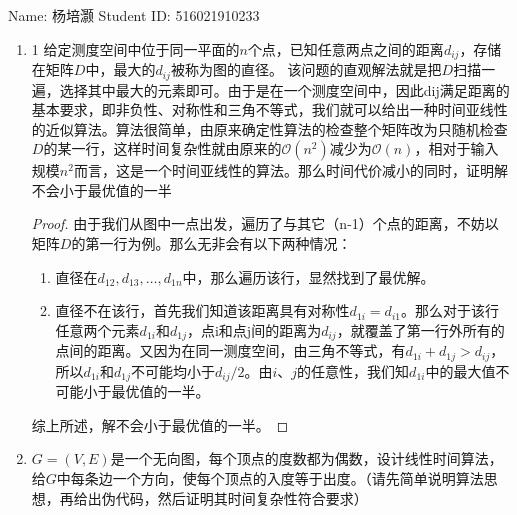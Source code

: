 \documentclass[12pt,a4paper]{article}
\theoremstyle{definition}
\begin{document}
\noindent

\noindent{}
\begin{center}

\footnotesize{\color{black} Name: 杨培灏  \quad Student ID: 516021910233}
\end{center}

\begin{enumerate}

\item 1 给定测度空间中位于同一平面的$n$个点，已知任意两点之间的距离$d_{ij}$，存储在矩阵$D$中，最大的$d_{ij}$被称为图的直径。
该问题的直观解法就是把$D$扫描一遍，选择其中最大的元素即可。由于是在一个测度空间中，因此dij满足距离的基本要求，即非负性、对称性和三角不等式，我们就可以给出一种时间亚线性的近似算法。算法很简单，由原来确定性算法的检查整个矩阵改为只随机检查$D$的某一行，这样时间复杂性就由原来的$\mathcal{O}(n^2)$减少为$\mathcal{O}(n)$，相对于输入规模$n^2$而言，这是一个时间亚线性的算法。那么时间代价减小的同时，证明解不会小于最优值的一半

\begin{proof}
	由于我们从图中一点出发，遍历了与其它（n-1）个点的距离，不妨以矩阵$D$的第一行为例。那么无非会有以下两种情况：
	\begin{enumerate}
		\item 直径在$d_{12},d_{13},\ldots,d_{1n}$中，那么遍历该行，显然找到了最优解。
		\item 直径不在该行，首先我们知道该距离具有对称性$d_{1i}=d_{i1}$。那么对于该行任意两个元素$d_{1i}$和$d_{1j}$，点i和点j间的距离为$d_{ij}$，就覆盖了第一行外所有的点间的距离。又因为在同一测度空间，由三角不等式，有$d_{1i}+d_{1j}>d_{ij}$，所以$d_{1i}$和$d_{1j}$不可能均小于$d_{ij}/2$。由$i$、$j$的任意性，我们知$d_{1i}$中的最大值不可能小于最优值的一半。
	\end{enumerate}
	综上所述，解不会小于最优值的一半。
\end{proof}

\item $G=(V,E)$是一个无向图，每个顶点的度数都为偶数，设计线性时间算法，给$G$中每条边一个方向，使每个顶点的入度等于出度。（请先简单说明算法思想，再给出伪代码，然后证明其时间复杂性符合要求）


\end{enumerate}
\end{document}
